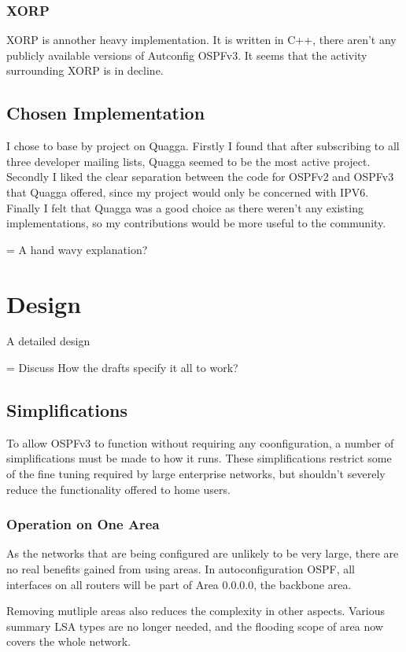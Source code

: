 \documentclass[12pt]{report}
\begin{document}
\subsection{XORP}
XORP is annother heavy implementation. It is written in C++, there aren't any publicly available versions of Autconfig OSPFv3. It seems that the activity surrounding XORP is in decline. 

\section{Chosen Implementation}
I chose to base by project on Quagga. Firstly I found that after subscribing to all 
three developer mailing lists, Quagga seemed to be the most active project. Secondly 
I liked the clear separation between the code for OSPFv2 and OSPFv3 that Quagga 
offered, since my project would only be concerned with IPV6. Finally I felt that 
Quagga was a good choice as there weren't any existing implementations, so my 
contributions would be more useful to the community.

= A hand wavy explanation?

\chapter{Design}
A detailed design

= Discuss How the drafts specify it all to work?

\section{Simplifications}

To allow OSPFv3 to function without requiring any coonfiguration, a number of 
simplifications must be made to how it runs. These simplifications restrict some of 
the fine tuning required by large enterprise networks, but shouldn't severely reduce 
the functionality offered to home users. 

\subsection{Operation on One Area}
As the networks that are being configured are unlikely to be very large, there are 
no real benefits gained from using areas. In autoconfiguration OSPF, all interfaces 
on all routers will be part of Area 0.0.0.0, the backbone area.

Removing mutliple areas also reduces the complexity in other aspects. Various 
summary LSA types are no longer needed, and the flooding scope of area now covers the whole network.
\end{document}
